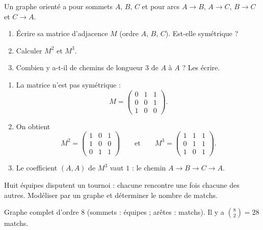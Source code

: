 \begin{exercise}
Un graphe orienté a pour sommets $A$, $B$, $C$ et pour arcs $A\to B$, $A\to C$, $B\to C$ et $C\to A$.
\begin{enumerate}
\item Écrire sa matrice d'adjacence $M$ (ordre $A$, $B$, $C$). Est-elle symétrique ?
\item Calculer $M^2$ et $M^3$.
\item Combien y a-t-il de chemins de longueur $3$ de $A$ à $A$ ? Les écrire.
\end{enumerate}
\end{exercise}
\begin{solution}
\begin{enumerate}
\item La matrice n'est pas symétrique : \[M=\begin{pmatrix}0&1&1\\0&0&1\\1&0&0\end{pmatrix}.\]
\item On obtient \[M^2=\begin{pmatrix}1&0&1\\1&0&0\\0&1&1\end{pmatrix}\qquad\text{et}\qquad M^3=\begin{pmatrix}1&1&1\\0&1&1\\1&0&1\end{pmatrix}.\]
\item Le coefficient $(A,A)$ de $M^3$ vaut $1$ : le chemin $A\to B\to C\to A$.
\end{enumerate}
\end{solution}

\begin{exercise}[Un tournoi]
Huit équipes disputent un tournoi : chacune rencontre une fois chacune des autres. Modéliser par un graphe et déterminer le nombre de matchs.
\end{exercise}
\begin{solution}
Graphe complet d'ordre $8$ (sommets : équipes ; arêtes : matchs). Il y a $\binom82=28$ matchs.
\end{solution}

